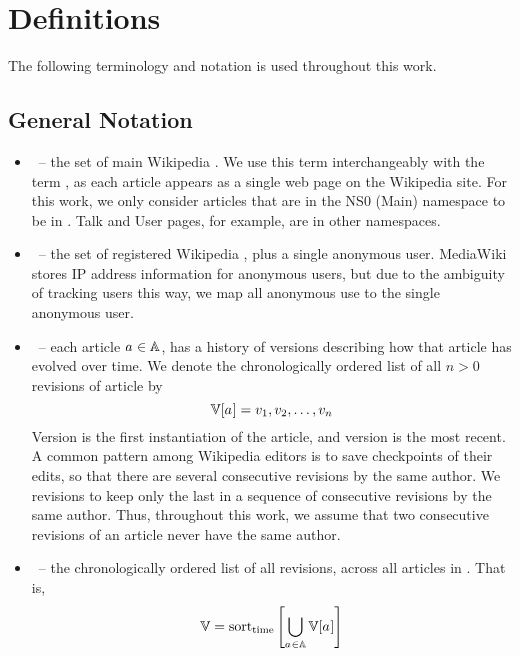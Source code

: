 
\chapter{Definitions}
\label{ch:defs}

The following terminology and notation
is used throughout this work.

\renewcommand{\labelitemi}{}

\section{General Notation}
\begin{itemize}
\item \articles \ -- the set of main Wikipedia .
    We use this term interchangeably with the term ,
    as each article appears as a single web page on the Wikipedia site.
    For this work, we only consider articles that are in
    the NS0 (Main) namespace to be in \articles.
    Talk and User pages, for example, are in other namespaces.
\item \users \ -- the set of registered Wikipedia ,
    plus a single anonymous user.
    MediaWiki stores IP address information for anonymous users,
    but due to the ambiguity of tracking users this way,
    we map all anonymous use to the single anonymous user.
\item \versions{\article{}} \ -- each article $a_{} \in \mathbb{A}$,
    has a history of versions
    describing how that article has evolved over time.
    We denote the chronologically ordered list
    of all $n > 0$ revisions of article \article{} by
    \begin{equation}
	\versions{\article{}} =
		\version{1}, \version{2}, \ldots, \version{n}
    \end{equation}
    Version  is the first instantiation of the article,
    and version  is the most recent.
    A common pattern among Wikipedia editors is to save checkpoints
    of their edits, so that there are several consecutive revisions by
    the same author.
    We  revisions to keep only the last in a sequence of
    consecutive revisions by the same author.
    Thus, throughout this work, we assume that two consecutive revisions
    of an article never have the same author.
\item \versions{} \ -- the chronologically ordered list of all
    revisions, across all articles in \articles.
    That is,
    \begin{equation}
    \versions{} = \mathrm{sort}_\mathrm{time}\left[
	\bigcup_{\article{} \in \articles} \versions{\article{}}
	\right]
    \end{equation}

\end{itemize}

